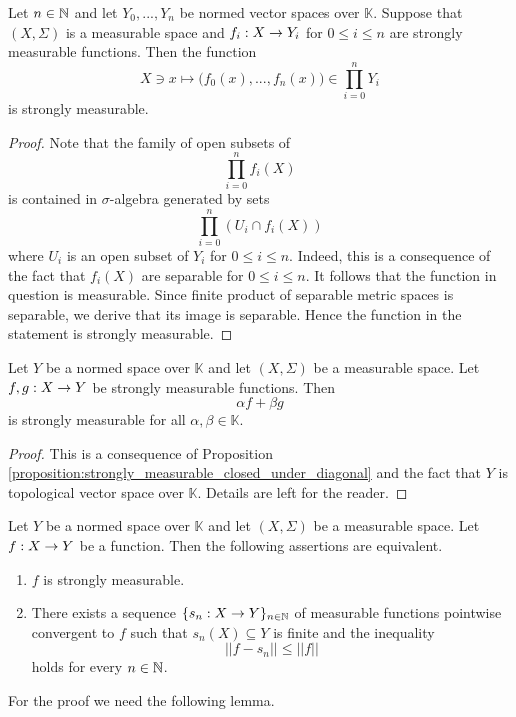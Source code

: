 \begin{proposition}\label{proposition:strongly_measurable_closed_under_diagonal}
    Let $n\in {\mathbb N}$ and let $Y_0, ...,Y_n$ be normed vector spaces over $\mathbb{K}$. Suppose that $(X,\Sigma)$ is a measurable space and $f_i:X\rightarrow Y_i$ for $0 \leq i \leq n$ are strongly measurable functions. Then the function
    $$X\ni x \mapsto \bigg(f_0(x),...,f_n(x)\bigg) \in \prod_{i=0}^nY_i$$
    is strongly measurable.
\end{proposition}
\begin{proof}
    Note that the family of open subsets of
    $$\prod_{i=0}^nf_i(X)$$
    is contained in $\sigma$-algebra generated by sets
    $$\prod_{i=0}^n\left(U_i\cap f_i(X)\right)$$
    where $U_i$ is an open subset of $Y_i$ for $0\leq i \leq n$. Indeed, this is a consequence of the fact that $f_i(X)$ are separable for $0\leq i\leq n$. It follows that the function in question is measurable. Since finite product of separable metric spaces is separable, we derive that its image is separable. Hence the function in the statement is strongly measurable.
\end{proof}

\begin{corollary}\label{corollary:strongly_measurable_form_vector_space}
    Let $Y$ be a normed space over $\mathbb{K}$ and let $(X,\Sigma)$ be a measurable space. Let $f, g:X\rightarrow Y$ be strongly measurable functions. Then
    $$\alpha f + \beta g$$
    is strongly measurable for all $\alpha,\beta \in \mathbb{K}$.
\end{corollary}
\begin{proof}
    This is a consequence of Proposition \ref{proposition:strongly_measurable_closed_under_diagonal} and the fact that $Y$ is topological vector space over $\mathbb{K}$. Details are left for the reader.
\end{proof}

\begin{theorem}\label{theorem:simple_approximation_strongly_measurable}
    Let $Y$ be a normed space over $\mathbb{K}$ and let $(X,\Sigma)$ be a measurable space. Let $f:X\rightarrow Y$ be a function. Then the following assertions are equivalent.
    \begin{enumerate}[label=\emph{\textbf{(\roman*)}}, leftmargin=*]
        \item $f$ is strongly measurable.
        \item There exists a sequence $\{s_n:X\rightarrow Y\}_{n\in {\mathbb N}}$ of measurable functions pointwise convergent to $f$ such that $s_n(X)\subseteq Y$ is finite and the inequality
              $$||f - s_n||\leq ||f||$$
              holds for every $n\in {\mathbb N}$.
    \end{enumerate}
\end{theorem}
\noindent
For the proof we need the following lemma.

